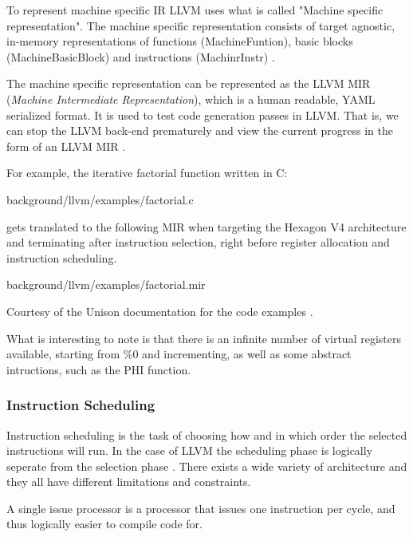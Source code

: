 To represent machine specific IR LLVM uses what is called "Machine specific representation".
The machine specific representation consists of target agnostic, in-memory representations
of functions (MachineFuntion), basic blocks (MachineBasicBlock) and instructions
(MachinrInstr) \cite{llvm-mir-lang-ref, llvm-codegenerator-machinecode}.

The machine specific representation can be represented as the LLVM MIR (\textit{Machine
Intermediate Representation}), which is a human readable, YAML serialized format. It is
used to test code generation passes in LLVM. That is, we can stop the LLVM back-end
prematurely and view the current progress in the form of an LLVM MIR
\cite{llvm-mir-lang-ref}.

For example, the iterative factorial function written in C:


{background/llvm/examples/factorial.c}

gets translated to the following MIR when targeting the Hexagon V4 architecture and
terminating after instruction selection, right before register allocation and instruction
scheduling.


{background/llvm/examples/factorial.mir}

Courtesy of the Unison documentation for the code examples \cite{unison-docs-examples}.

What is interesting to note is that there is an infinite number of virtual registers available,
starting from \%0 and incrementing, as well as some abstract intructions, such as the PHI
function.

\subsubsection{Instruction Scheduling}
Instruction scheduling is the task of choosing how and in which order the selected instructions
will run. In the case of LLVM the scheduling phase is logically seperate from the selection
phase \cite{llvm-codegenerator-scheduling}. There exists a wide variety of architecture
and they all have different limitations and constraints.

A single issue processor is a processor that issues one instruction per cycle, and thus
logically easier to compile code for.

